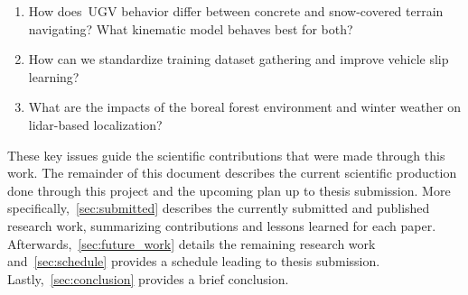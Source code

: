 \begin{enumerate}\bfseries
  	\item How does~\ac{UGV} behavior differ between concrete and snow-covered terrain navigating? What kinematic model behaves best for both?
  	\item How can we standardize training dataset gathering and improve vehicle slip learning?
	\item What are the impacts of the boreal forest environment and winter weather on lidar-based localization?
\end{enumerate}

These key issues guide the scientific contributions that were made through this work.
The remainder of this document describes the current scientific production done through this project and the upcoming plan up to thesis submission.
More specifically,~\autoref{sec:submitted} describes the currently submitted and published research work, summarizing contributions and lessons learned for each paper. 
Afterwards,~\autoref{sec:future_work} details the remaining research work and~\autoref{sec:schedule} provides a schedule leading to thesis submission.
Lastly,~\autoref{sec:conclusion} provides a brief conclusion.
